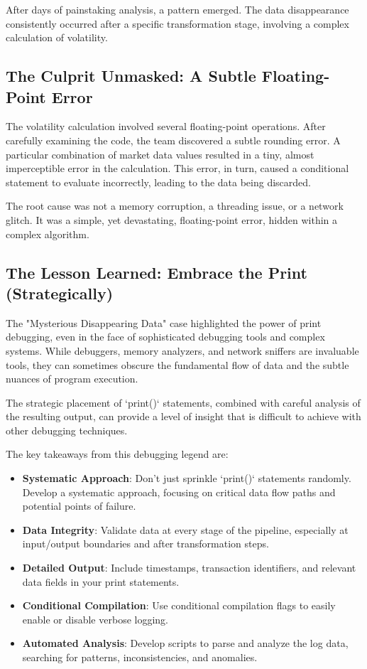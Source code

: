 \documentclass{article}
\begin{document}
{{{{After days of painstaking analysis, a pattern emerged. The data disappearance consistently occurred after a specific transformation stage, involving a complex calculation of volatility.

\subsection*{The Culprit Unmasked: A Subtle Floating-Point Error}

The volatility calculation involved several floating-point operations. After carefully examining the code, the team discovered a subtle rounding error. A particular combination of market data values resulted in a tiny, almost imperceptible error in the calculation. This error, in turn, caused a conditional statement to evaluate incorrectly, leading to the data being discarded.

The root cause was not a memory corruption, a threading issue, or a network glitch. It was a simple, yet devastating, floating-point error, hidden within a complex algorithm.

\subsection*{The Lesson Learned: Embrace the Print (Strategically)}

The "Mysterious Disappearing Data" case highlighted the power of print debugging, even in the face of sophisticated debugging tools and complex systems. While debuggers, memory analyzers, and network sniffers are invaluable tools, they can sometimes obscure the fundamental flow of data and the subtle nuances of program execution.

The strategic placement of `print()` statements, combined with careful analysis of the resulting output, can provide a level of insight that is difficult to achieve with other debugging techniques.

The key takeaways from this debugging legend are:

\begin{itemize}
    \item \textbf{Systematic Approach}: Don't just sprinkle `print()` statements randomly. Develop a systematic approach, focusing on critical data flow paths and potential points of failure.
    \item \textbf{Data Integrity}: Validate data at every stage of the pipeline, especially at input/output boundaries and after transformation steps.
    \item \textbf{Detailed Output}: Include timestamps, transaction identifiers, and relevant data fields in your print statements.
    \item \textbf{Conditional Compilation}: Use conditional compilation flags to easily enable or disable verbose logging.
    \item \textbf{Automated Analysis}: Develop scripts to parse and analyze the log data, searching for patterns, inconsistencies, and anomalies.
\end{itemize}

}}}}
\end{document}
